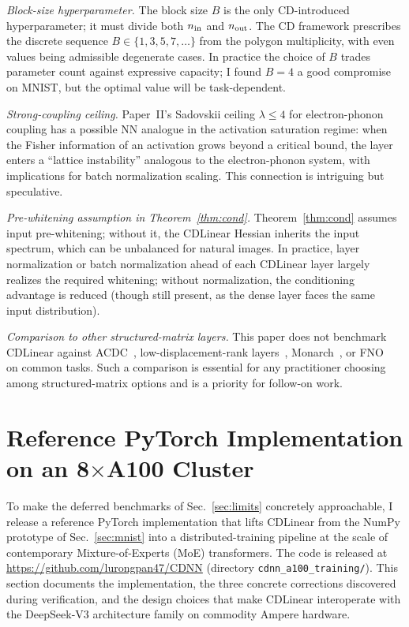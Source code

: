 \documentclass[aps,prx,onecolumn,11pt,nofootinbib,longbibliography]{revtex4-2}
\begin{document}
\textit{Block-size hyperparameter.}  The block size $B$ is the only
CD-introduced hyperparameter; it must divide both $n_{\rm in}$ and
$n_{\rm out}$.  The CD framework prescribes the discrete sequence $B \in
\{1,3,5,7,\ldots\}$ from the polygon multiplicity, with even values being
admissible degenerate cases.  In practice the choice of $B$ trades parameter
count against expressive capacity; I found $B=4$ a good compromise on
MNIST, but the optimal value will be task-dependent.

\textit{Strong-coupling ceiling.}  Paper~II's Sadovskii ceiling
$\lambda \leq 4$ for electron-phonon coupling has a possible NN analogue
in the activation saturation regime: when the Fisher information of an
activation grows beyond a critical bound, the layer enters a ``lattice
instability'' analogous to the electron-phonon system, with implications
for batch normalization scaling.  This connection is intriguing but
speculative.

\textit{Pre-whitening assumption in Theorem~\ref{thm:cond}.}
Theorem~\ref{thm:cond} assumes input pre-whitening; without it, the CDLinear
Hessian inherits the input spectrum, which can be unbalanced for natural
images.  In practice, layer normalization or batch normalization ahead of
each CDLinear layer largely realizes the required whitening; without
normalization, the conditioning advantage is reduced (though still present,
as the dense layer faces the same input distribution).

\textit{Comparison to other structured-matrix layers.}  This paper does not
benchmark CDLinear against ACDC~\cite{Moczulski2016}, low-displacement-rank
layers~\cite{Thomas2018}, Monarch~\cite{Dao2022}, or FNO~\cite{Li2020} on
common tasks.  Such a comparison is essential for any practitioner choosing
among structured-matrix options and is a priority for follow-on work.

\section{Reference PyTorch Implementation on an 8$\times$A100 Cluster}
\label{sec:impl}

To make the deferred benchmarks of Sec.~\ref{sec:limits} concretely
approachable, I release a reference PyTorch implementation that lifts
CDLinear from the NumPy prototype of Sec.~\ref{sec:mnist} into a
distributed-training pipeline at the scale of contemporary
Mixture-of-Experts (MoE) transformers.  The code is released at
\url{https://github.com/lurongpan47/CDNN} (directory
\texttt{cdnn\_a100\_training/}).  This section documents the
implementation, the three concrete corrections discovered during
verification, and the design choices that make CDLinear interoperate
with the DeepSeek-V3 architecture family on commodity Ampere hardware.
\end{document}
